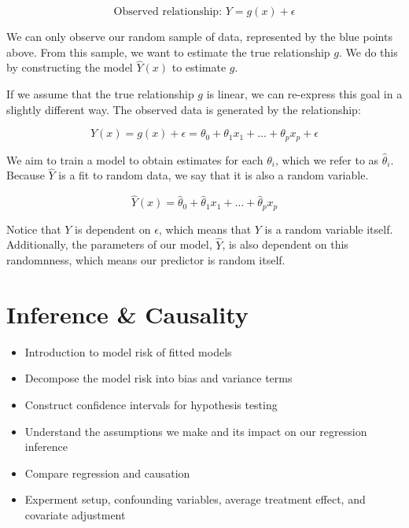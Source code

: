 \documentclass[
  letterpaper,
  DIV=11,
  numbers=noendperiod]{scrreprt}
\providecommand{\tightlist}{%
  \setlength{\itemsep}{0pt}\setlength{\parskip}{0pt}}\usepackage{longtable,booktabs,array}
\begin{document}
\[\text{Observed relationship: }Y = g(x) + \epsilon\]

We can only observe our random sample of data, represented by the blue
points above. From this sample, we want to estimate the true
relationship \(g\). We do this by constructing the model \(\hat{Y}(x)\)
to estimate \(g\).

If we assume that the true relationship \(g\) is linear, we can
re-express this goal in a slightly different way. The observed data is
generated by the relationship:

\[Y(x) = g(x) + \epsilon = \theta_0 + \theta_1 x_1 + \ldots + \theta_p x_p + \epsilon\]

We aim to train a model to obtain estimates for each \(\theta_i\), which
we refer to as \(\hat{\theta}_i\). Because \(\hat{Y}\) is a fit to
random data, we say that it is also a random variable.

\[\hat{Y}(x) = \hat{\theta}_0 + \hat{\theta}_1 x_1 + \ldots + \hat{\theta}_p x_p\]

Notice that \(Y\) is dependent on \(\epsilon\), which means that \(Y\)
is a random variable itself. Additionally, the parameters of our model,
\(\hat{Y}\), is also dependent on this randomnness, which means our
predictor is random itself.


\hypertarget{inference-causality}{%
\chapter{Inference \& Causality}\label{inference-causality}}

\begin{tcolorbox}[enhanced jigsaw, bottomrule=.15mm, breakable, colbacktitle=quarto-callout-note-color!10!white, coltitle=black, opacitybacktitle=0.6, colback=white, bottomtitle=1mm, toprule=.15mm, title=\textcolor{quarto-callout-note-color}{\faInfo}\hspace{0.5em}{Note}, titlerule=0mm, arc=.35mm, leftrule=.75mm, toptitle=1mm, colframe=quarto-callout-note-color-frame, rightrule=.15mm, opacityback=0, left=2mm]

\begin{itemize}
\tightlist
\item
  Introduction to model risk of fitted models
\item
  Decompose the model risk into bias and variance terms
\item
  Construct confidence intervals for hypothesis testing
\item
  Understand the assumptions we make and its impact on our regression
  inference
\item
  Compare regression and causation
\item
  Experment setup, confounding variables, average treatment effect, and
  covariate adjustment
\end{itemize}

\end{tcolorbox}
\end{document}
